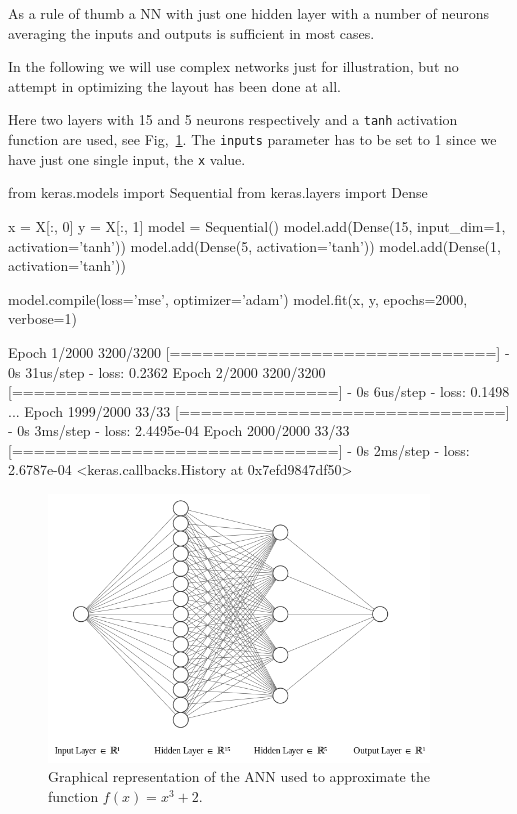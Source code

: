 As a rule of thumb a NN with just one hidden layer with a number of neurons averaging the inputs and outputs is sufficient in most cases.

In the following we will use complex networks just for illustration, but no attempt in optimizing the layout has been done at all.

Here two layers with 15 and 5 neurons respectively and a \texttt{tanh} activation function are used, see Fig,~\ref{fig:ann_1}. The \texttt{inputs} parameter has to be set to 1 since we have just one single input, the \texttt{x} value.

\begin{ipython}
from keras.models import Sequential
from keras.layers import Dense

x = X[:, 0]
y = X[:, 1]
model = Sequential()
model.add(Dense(15, input_dim=1, activation='tanh'))
model.add(Dense(5, activation='tanh'))
model.add(Dense(1, activation='tanh'))

model.compile(loss='mse', optimizer='adam')
model.fit(x, y, epochs=2000, verbose=1)
\end{ipython}
\begin{ioutput}
Epoch 1/2000
3200/3200 [==============================] - 0s 31us/step - loss: 0.2362
Epoch 2/2000
3200/3200 [==============================] - 0s 6us/step - loss: 0.1498
...
Epoch 1999/2000
33/33 [==============================] - 0s 3ms/step - loss: 2.4495e-04
Epoch 2000/2000
33/33 [==============================] - 0s 2ms/step - loss: 2.6787e-04
<keras.callbacks.History at 0x7efd9847df50>
\end{ioutput}

\begin{figure}[htb]
\centering
\includegraphics[width=0.9\textwidth]{figures/ann_1.png}
\caption{Graphical representation of the ANN used to approximate the function $f(x) = x^3 + 2$.}
\label{fig:ann_1}
\end{figure}


